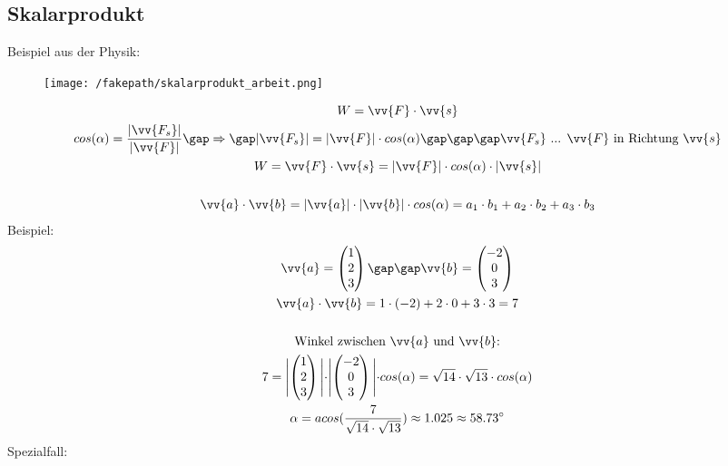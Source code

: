 \subsection{Skalarprodukt}
Beispiel aus der Physik:
\begin{figure}[H]
  \centering
  \texttt{[image: /fakepath/skalarprodukt\_arbeit.png]}
\end{figure}
\begin{gather*}
  W = \vv{F} \cdot \vv{s} \\
  cos(\alpha) = \frac{|\vv{F_s}|}{|\vv{F}|} \gap\Rightarrow\gap |\vv{F_s}| = |\vv{F}| \cdot cos(\alpha) \gap\gap\gap \text{$\vv{F_s}$ ... $\vv{F}$ in Richtung $\vv{s}$} \\
  W = \vv{F} \cdot \vv{s} = |\vv{F}| \cdot cos(\alpha) \cdot |\vv{s}| \\\\
  \vv{a} \cdot \vv{b} = |\vv{a}| \cdot |\vv{b}| \cdot cos(\alpha) = a_1 \cdot b_1 + a_2 \cdot b_2 + a_3 \cdot b_3 \\
\end{gather*}
Beispiel:
\begin{gather*}
  \vv{a} = \begin{pmatrix}1 \\ 2 \\ 3\end{pmatrix} \gap\gap \vv{b} = \begin{pmatrix}-2 \\ 0 \\ 3\end{pmatrix} \\
  \vv{a} \cdot \vv{b} = 1 \cdot (-2) + 2 \cdot 0 + 3 \cdot 3 = 7 \\\\
  \text{Winkel zwischen $\vv{a}$ und $\vv{b}$:} \\
  7 = \Biggl|\begin{pmatrix}1 \\ 2 \\ 3\end{pmatrix}\Biggl| \cdot \Biggl|\begin{pmatrix}-2 \\ 0 \\ 3\end{pmatrix}\Biggl| \cdot cos(\alpha) = \sqrt{14} \cdot \sqrt{13} \cdot cos(\alpha) \\
  \alpha = acos(\frac{7}{\sqrt{14} \cdot \sqrt{13}}) \approx 1.025 \approx 58.73^\circ
\end{gather*}
Spezialfall:
